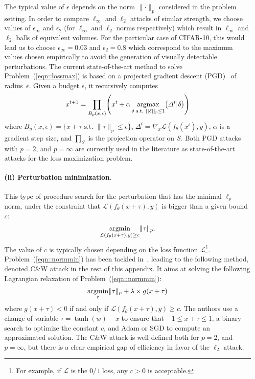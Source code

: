 The typical value of $\epsilon$ depends on the norm $\lVert\cdot\rVert_p$ considered in the problem setting. In order to compare $\ell_\infty$ and $\ell_2$ attacks of similar strength, we choose values of $\epsilon_\infty$ and $\epsilon_2$ (for $\ell_\infty$ and $\ell_2$ norms respectively) which result in $\ell_\infty$ and $\ell_2$ balls of equivalent volumes. For the particular case of CIFAR-10, this would lead us to choose $\epsilon_\infty = 0.03$ and $\epsilon_2 = 0.8$ which correspond to the maximum values chosen empirically to avoid the generation of visually detectable perturbations. 
The current state-of-the-art method to solve Problem~(\ref{eqn::lossmax}) is based on a projected gradient descent (PGD)~\cite{madry2018towards} of radius~$\epsilon$. Given a budget $\epsilon$, it recursively computes
\begin{equation}
    x^{t+1}=\prod_{B_p(x,\epsilon)}\left(x^t
+\alpha \argmaxB_{\delta\text{ s.t. }||\delta||_p\leq1} \left(\Delta^t|\delta \right)\right)
    \label{eqn::projectionPGD}
\end{equation}
where $B_p(x,\epsilon) = \{ x+\tau \text{~s.t.~} \lVert\tau\rVert_p \leq \epsilon\}$, $\Delta^t=\nabla_x\mathcal{L}\left(f_\theta\left(x^t\right),y\right)$, $\alpha$ is a gradient step size, and $\prod_S$ is the projection operator on $S$. Both PGD attacks with $p=2$, and $p=\infty$ are currently used in the literature as state-of-the-art attacks for the loss maximization problem. 


\paragraph{(ii) Perturbation minimization.}  This type of procedure search for the perturbation that has the minimal $\ell_p$ norm, under the constraint that $\mathcal{L}(f_\theta(x+\tau),y)$ is bigger than a given bound $c$:
    \begin{equation}
      \operatorname*{argmin}_{\mathcal{L}(f_\theta(x+\tau),y) \geq c} 
      \lVert\tau\rVert_p.
      \label{eqn::normmin}
  \end{equation}
  The value of $c$ is typically chosen depending on the loss function $\mathcal{L}$\footnote{For example, if $\mathcal{L}$ is the $0/1$ loss, any $c>0$ is acceptable.}.
  Problem~(\ref{eqn::normmin}) has been tackled in~\cite{carlini2017towards}, leading to the following method, denoted C\&W attack in the rest of this appendix. It aims at solving the following Lagrangian relaxation of Problem~(\ref{eqn::normmin}):
  \begin{equation}
    \operatorname*{argmin}_{\tau} \lVert\tau\rVert_p+ \lambda \times g(x+\tau)
    \label{eqn::CWproblem}
\end{equation}
where $g(x+\tau)<0$ if and only if $\mathcal{L}(f_\theta(x+\tau),y) \geq c$. 
The authors use a change of variable $\tau=\tanh(w)-x$ to ensure that $-1 \leq x+\tau \leq 1$, a binary search to optimize the constant $c$, and Adam or SGD to compute an approximated solution. The C\&W attack is well defined both for $p=2$, and $p=\infty$, but there is a clear empirical gap of efficiency in favor of the $\ell_2$ attack.

